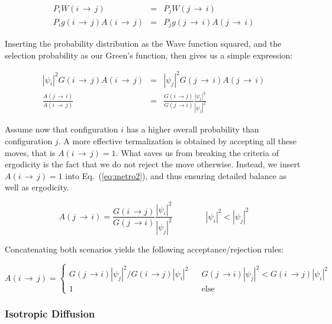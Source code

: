 \begin{eqnarray}
 \label{eq:metro1}
 P_iW(i\,\rightarrow\,j) &=& P_jW(j\,\rightarrow\,i) \nonumber \\
 P_ig(i\,\rightarrow\,j)A(i\,\rightarrow\,j) &=& P_jg(j\,\rightarrow\,i)A(j\,\rightarrow\,i)
\end{eqnarray}

Inserting the probability distribution as the Wave function squared, and the selection probability as our Green's function, then gives us a simple expression:

\begin{eqnarray}
  \label{eq:metro2}
  |\psi_i|^2G(i\,\rightarrow\,j)A(i\,\rightarrow\,j) &=& |\psi_j|^2G(j\,\rightarrow\,i)A(j\,\rightarrow\,i) \nonumber \\
  \frac{A(j\,\rightarrow\,i)}{A(i\,\rightarrow\,j)} &=& \frac{G(i\,\rightarrow j)}{G(j\,\rightarrow i)}\frac{|\psi_i|^2}{|\psi_j|^2}
\end{eqnarray}

Assume now that configuration $i$ has a higher overall probability than configuration $j$. A more effective termalization is obtained by accepting all these moves, that is $A(i\,\rightarrow\,j) = 1$. What saves us from breaking the criteria of ergodicity is the fact that we do not reject the move otherwise. Instead, we insert $A(i\,\rightarrow\,j) = 1$ into Eq.~(\ref{eq:metro2}), and thus ensuring detailed balance as well as ergodicity.

\begin{equation*}
 A(j\,\rightarrow\,i) = \frac{G(i\,\rightarrow j)}{G(j\,\rightarrow i)}\frac{|\psi_i|^2}{|\psi_j|^2} \qquad\qquad  |\psi_i|^2 < |\psi_j|^2
\end{equation*}


Concatenating both scenarios yields the following acceptance/rejection rules:

\begin{equation}
\label{eq:MetroGeneralGreen}
 A(i\,\rightarrow\,j) = \left\{\begin{array}{ccc}
 G(j\,\rightarrow i)|\psi_j|^2/G(i\,\rightarrow j)|\psi_i|^2& & G(j\,\rightarrow i)|\psi_j|^2 < G(i\,\rightarrow j)|\psi_i|^2\\
1  & & \mathrm{else}  \end{array}\right.
\end{equation}

\subsubsection{Isotropic Diffusion}

